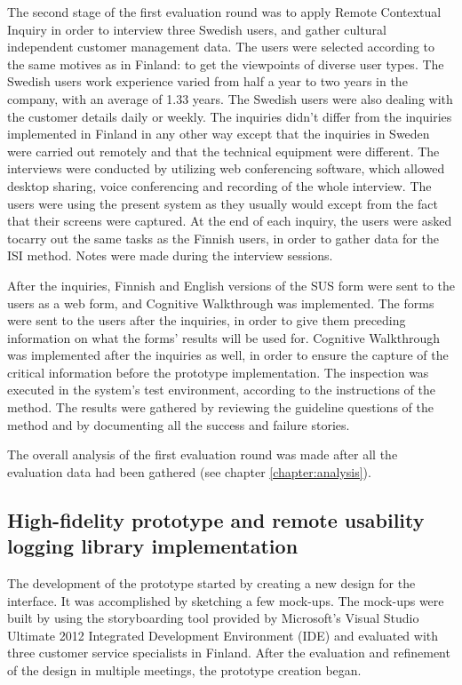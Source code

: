 \documentclass[12pt,a4paper,oneside,pdftex]{report}
\begin{document}
The second stage of the first evaluation round was to apply Remote Contextual Inquiry in order to interview three Swedish users, and gather cultural independent customer management data. The users were selected according to the same motives as in Finland: to get the viewpoints of diverse user types. The Swedish users work experience varied from half a year to two years in the company, with an average of 1.33 years. The Swedish users were also dealing with the customer details daily or weekly. The inquiries didn't differ from the inquiries implemented in Finland in any other way except that the inquiries in Sweden were carried out remotely and that the technical equipment were different. The interviews were conducted by utilizing web conferencing software, which allowed desktop sharing, voice conferencing and recording of the whole interview. The users were using the present system as they usually would except from the fact that their screens were captured. At the end of each inquiry, the users were asked tocarry out the same tasks as the Finnish users, in order to gather data for the ISI method. Notes were made during the  interview sessions.

After the inquiries, Finnish and English versions of the SUS form were sent to the users as a web form, and Cognitive Walkthrough was implemented. The forms were sent to the users after the inquiries, in order to give them preceding information on what the forms' results will be used for. Cognitive Walkthrough was implemented after the inquiries as well, in order to ensure the capture of the critical information before the prototype implementation. The inspection was executed in the system's test environment, according to the instructions of the method. The results were gathered by reviewing the guideline questions of the method and by documenting all the success and failure stories. 

The overall analysis of the first evaluation round was made after all the evaluation data had been gathered  (see chapter \ref{chapter:analysis}). 

\subsection{High-fidelity prototype and remote usability logging library implementation}

The development of the prototype started by creating a new design for the interface. It was accomplished by sketching a few mock-ups. The mock-ups were built by using the storyboarding tool provided by Microsoft's Visual Studio Ultimate 2012 Integrated Development Environment (IDE) and evaluated with three customer service specialists in Finland. After the evaluation and refinement of the design in multiple meetings, the prototype creation began.
\end{document}
